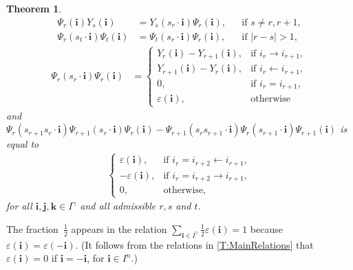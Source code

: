 \documentclass[leqno]{amsart}
\theoremstyle{plain}
\newcounter{mainTheorem}
\newtheorem{MainTheorem}[mainTheorem]{Theorem}
\numberwithin{mainCorollary}{mainTheorem}
\numberwithin{equation}{section}
{\newaliascnt{{Assumption}}{equation}
\newtheorem{{Assumption}}[{Assumption}]{{Assumption}}
\aliascntresetthe{{Assumption}}
\expandafterautorefname\endcsname{{Assumption}}
}
{\newaliascnt{{Proposition}}{equation}
\newtheorem{{Proposition}}[{Proposition}]{{Proposition}}
\aliascntresetthe{{Proposition}}
\expandafterautorefname\endcsname{{Proposition}}
}
{\newaliascnt{{Theorem}}{equation}
\newtheorem{{Theorem}}[{Theorem}]{{Theorem}}
\aliascntresetthe{{Theorem}}
\expandafterautorefname\endcsname{{Theorem}}
}
{\newaliascnt{{Corollary}}{equation}
\newtheorem{{Corollary}}[{Corollary}]{{Corollary}}
\aliascntresetthe{{Corollary}}
\expandafterautorefname\endcsname{{Corollary}}
}
{\newaliascnt{{Conjecture}}{equation}
\newtheorem{{Conjecture}}[{Conjecture}]{{Conjecture}}
\aliascntresetthe{{Conjecture}}
\expandafterautorefname\endcsname{{Conjecture}}
}
{\newaliascnt{{Lemma}}{equation}
\newtheorem{{Lemma}}[{Lemma}]{{Lemma}}
\aliascntresetthe{{Lemma}}
\expandafterautorefname\endcsname{{Lemma}}
}
\theoremstyle{definition}
{\newaliascnt{{Definition}}{equation}
\newtheorem{{Definition}}[{Definition}]{{Definition}}
\aliascntresetthe{{Definition}}
\expandafterautorefname\endcsname{{Definition}}
}
\theoremstyle{remark}
{\newaliascnt{{Remark}}{equation}
\newtheorem{{Remark}}[{Remark}]{{Remark}}
\aliascntresetthe{{Remark}}
\expandafterautorefname\endcsname{{Remark}}
}
\let\eps=\varepsilon
\begin{document}
\begin{MainTheorem}
{\begin{align*}
      \Psi_r({\mathbf{i}})Y_s({\mathbf{i}}) &=Y_s(s_r\cdot{\mathbf{i}})\Psi_r({\mathbf{i}}),
      &&\text{if }s\neq r,r+1,\\
      \Psi_r(s_t\cdot{\mathbf{i}})\Psi_t({\mathbf{i}})
      &=\Psi_t(s_r\cdot{\mathbf{i}})\Psi_r({\mathbf{i}}),&&\text{if }|r-s|>1,
    \end{align*}
    \begin{align*}
      \Psi_r(s_r\cdot{\mathbf{i}})\Psi_r({\mathbf{i}})&= \begin{cases}
        Y_r({\mathbf{i}})-Y_{r+1}({\mathbf{i}}),&\text{if }i_r\to i_{r+1},\\
        Y_{r+1}({\mathbf{i}})-Y_r({\mathbf{i}}),&\text{if }i_r\leftarrow i_{r+1},\\
        0,&\text{if }i_r=i_{r+1},\\
        \eps({\mathbf{i}}),&\text{otherwise}
      \end{cases}
    \end{align*}
    and $\Psi_r(s_{r+1}s_r\cdot{\mathbf{i}})\Psi_{r+1}(s_r\cdot{\mathbf{i}})\Psi_r({\mathbf{i}})
    -\Psi_{r+1}(s_rs_{r+1}\cdot{\mathbf{i}})\Psi_r(s_{r+1}\cdot{\mathbf{i}})\Psi_{r+1}({\mathbf{i}})$
    is equal to
    \begin{align*}
      \begin{cases}
        \eps({\mathbf{i}}), &\text{if }i_r=i_{r+2}\leftarrow i_{r+1},\\
        -\eps({\mathbf{i}}), &\text{if }i_r=i_{r+2}\to i_{r+1},\\
        0,&\text{otherwise,}
      \end{cases}
    \end{align*}
    }    for all ${\mathbf{i}},{\mathbf{j}},{\mathbf{k}}\in I^\gamma$ and all admissible $r,s$ and $t$.
  \end{MainTheorem}

  The fraction~$\frac12$ appears in the relation $\sum_{{\mathbf{i}}\in
  I^\gamma}\frac12\eps({\mathbf{i}})=1$ because $\eps({\mathbf{i}})=\eps(-{\mathbf{i}})$.
  (It follows from the relations in \autoref{T:MainRelations} that
  $\eps({\mathbf{i}})=0$ if ${\mathbf{i}}=-{\mathbf{i}}$, for ${\mathbf{i}}\in I^n$.)
\end{document}
